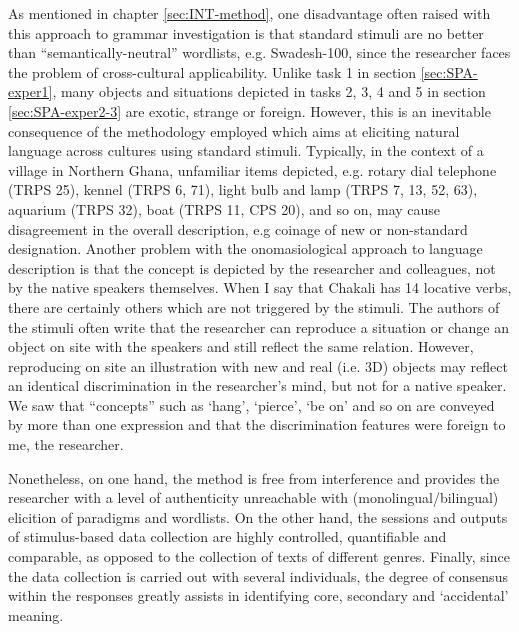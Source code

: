 As mentioned in chapter \ref{sec:INT-method}, one disadvantage often raised with
this approach to grammar investigation is
that
standard stimuli are no better than  ``semantically-neutral'' wordlists, e.g.
Swadesh-100, since the researcher faces the problem  of cross-cultural
applicability. Unlike task 1 in section \ref{sec:SPA-exper1}, many objects and
situations depicted in tasks 2, 3, 4 and 5 in section \ref{sec:SPA-exper2-3} are
exotic, strange or foreign. However, this is an inevitable consequence of the
methodology employed which aims at eliciting natural language across cultures
using standard stimuli. Typically, in the context of a village in Northern
Ghana, unfamiliar items depicted, e.g. rotary dial telephone  (TRPS 25),
 kennel (TRPS 6, 71), light bulb and lamp (TRPS 7, 13, 52, 63), aquarium (TRPS
32),  boat (TRPS 11, CPS 20), and so on,  may cause disagreement in the
overall description, e.g coinage of new or non-standard designation. Another
problem with the  onomasiological approach to language description is that the
concept is depicted by the researcher and colleagues, not by the native speakers
themselves. When I say that Chakali has 14 locative verbs, there are certainly
others which are not triggered by the  stimuli. The authors of the stimuli
often write that the researcher can reproduce a situation or change an object on
site with the speakers and still reflect the same relation. However, reproducing
on site an illustration with new and real (i.e. 3D) objects may reflect an
identical discrimination in the researcher's mind, but not for a native speaker.
We saw that ``concepts''  such as `hang', `pierce', `be on' and so on are
conveyed by more than one expression and that the discrimination features were
foreign to me, the researcher.

Nonetheless, on one hand, the method is free from interference and provides
the
researcher with a level of authenticity unreachable with (monolingual/bilingual)
elicition of paradigms and wordlists.  On the other hand,  the sessions and
outputs of stimulus-based data collection are highly controlled, quantifiable
and comparable, as opposed to the collection of texts of different genres.
Finally, since the data collection is carried out with several individuals, the
degree of consensus within the responses greatly assists  in
identifying core, secondary and `accidental' meaning.


\newpage


